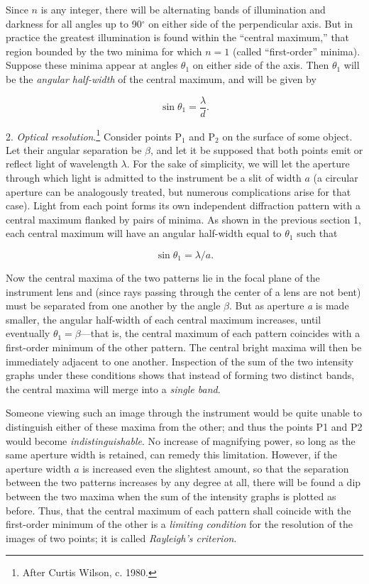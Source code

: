 Since $n$ is any integer, there will be alternating bands of
illumination and darkness for all angles up to 90$^\circ$ on either side of the
perpendicular axis. But in practice the greatest illumination is found
within the ``central maximum,'' that region bounded by the two minima
for which $n = 1$ (called ``first-order'' minima). Suppose these
minima appear at angles $\theta_1$ on either side of the axis. Then
$\theta_1$ will be the \emph{angular half-width} of the central maximum,
and will be given by

\begin{equation*}
\sin \theta_1 = \frac{\lambda}{d}.
\end{equation*}

2. \emph{Optical resolution}.\footnote{After Curtis Wilson, c. 1980.}
Consider points P$_1$ and P$_2$ on the surface of some object. Let their
angular separation be $\beta$, and let it be supposed that both points
emit or reflect light of wavelength $\lambda$. For the sake of
simplicity, we will let the aperture through which light is admitted to
the instrument be a slit of width $a$ (a circular aperture can be
analogously treated, but numerous complications arise for that case).
Light from each point forms its own independent diffraction pattern with
a central maximum flanked by pairs of minima. As shown in the previous
section 1, each central maximum will have an angular half-width equal to
$\theta_1$ such that

\begin{equation*}
\sin \theta_1 = \lambda/a.
\end{equation*}

Now the central maxima of the two patterns lie in the focal plane of the
instrument lens and (since rays passing through the center of a lens are
not bent) must be separated from one another by the angle $\beta$. But
as aperture \emph{a} is made smaller, the angular half-width of each
central maximum increases, until eventually $\theta_1 = \beta$---that
is, the central maximum of each pattern coincides with a first-order
minimum of the other pattern. The central bright maxima will then be
immediately adjacent to one another. Inspection of the sum of the two
intensity graphs under these conditions shows that instead of forming
two distinct bands, the central maxima will merge into a \emph{single
band}.

Someone viewing such an image through the instrument would be quite
unable to distinguish either of these maxima from the other; and thus
the points P1 and P2 would become \emph{indistinguishable}. No increase
of magnifying power, so long as the same aperture width is retained, can
remedy this limitation. However, if the aperture width $a$ is
increased even the slightest amount, so that the separation between the
two patterns increases by any degree at all, there will be found a dip
between the two maxima when the sum of the intensity graphs is plotted
as before. Thus, that the central maximum of each pattern shall coincide
with the first-order minimum of the other is a \emph{limiting condition}
for the resolution of the images of two points; it is called
\emph{Rayleigh's criterion}.

